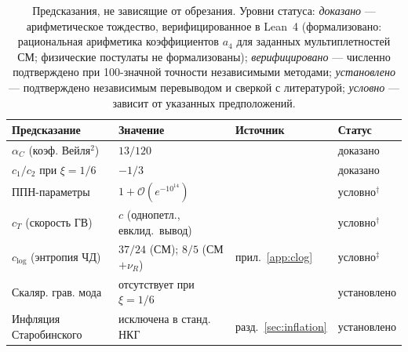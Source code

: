 \documentclass[12pt,a4paper]{article}
\theoremstyle{plain}
\theoremstyle{definition}
\theoremstyle{remark}
\newcommand{\order}{\mathcal{O}}
\begin{document}
\begin{table}[ht]
\centering
\caption{Предсказания, не зависящие от обрезания. Уровни
статуса: \emph{доказано} --- арифметическое тождество, верифицированное
в Lean~4 (формализовано: рациональная арифметика коэффициентов $a_4$
для заданных мультиплетностей СМ; физические постулаты не формализованы);
\emph{верифицировано} --- численно подтверждено при 100-значной точности
независимыми методами; \emph{установлено} --- подтверждено независимым
перевыводом и сверкой с литературой; \emph{условно} --- зависит от
указанных предположений.}
\label{tab:robust}
\begin{tabular}{p{4.2cm}p{3.5cm}ll}
\toprule
Предсказание & Значение & Источник & Статус \\
\midrule
$\alpha_C$ (коэф. Вейля${}^2$) & $13/120$ & \cite{Alfyorov:2026paper1} & доказано \\
$c_1/c_2$ при $\xi = 1/6$ & $-1/3$ & \cite{Alfyorov:2026paper1} & доказано \\
ППН-параметры &
  $1 + \order(e^{-10^{14}})$ & \cite{Alfyorov:2026paper2} & условно${}^\dagger$ \\
$c_T$ (скорость ГВ) & $c$ (однопетл., евклид.\ вывод) & \cite{Alfyorov:2026paper4} & условно${}^\dagger$ \\
$c_{\log}$ (энтропия ЧД) & $37/24$ (СМ); $8/5$ (СМ$+\nu_R$) & прил.~\ref{app:clog} & условно${}^\ddagger$ \\
Скаляр. грав. мода & отсутствует при $\xi = 1/6$ & \cite{CCM:2006,vS:2015} & установлено \\
Инфляция Старобинского & исключена в станд. НКГ & разд.~\ref{sec:inflation} & установлено \\
\bottomrule
\end{tabular}

\smallskip{}
\end{table}
\end{document}
